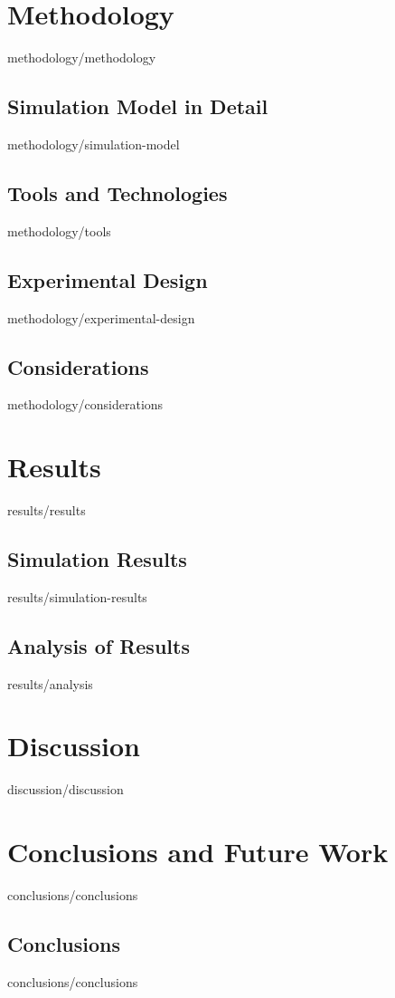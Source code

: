 \documentclass[epsbased,copyright,final,covers,extendedindex,firstnumbered,tfm,gnuplot,english]{tfgtfmthesisuam}
\begin{document}
\chapter{Methodology\label{CAP:METHODOLOGY}}{methodology/methodology}
  \section{Simulation Model in Detail\label{SEC:SIMULATIONMODELD}}{methodology/simulation-model}
  \section{Tools and Technologies\label{SEC:TOOLS}}{methodology/tools}
  \section{Experimental Design\label{SEC:EXPERIMENTALDESIGN}}{methodology/experimental-design}
  \section{Considerations\label{SEC:CONSIDERATIONS}}{methodology/considerations}

\chapter{Results\label{CAP:RESULTS}}{results/results}
  \section{Simulation Results\label{SEC:SIMULATIONRESULTS}}{results/simulation-results}
  \section{Analysis of Results\label{SEC:ANALYSIS}}{results/analysis}

\chapter{Discussion\label{CAP:DISCUSSION}}{discussion/discussion}

\chapter{Conclusions and Future Work\label{CAP:CONCLUSIONS}}{conclusions/conclusions}
  \section{Conclusions\label{SEC:CONCLUSIONS}}{conclusions/conclusions}
\end{document}
